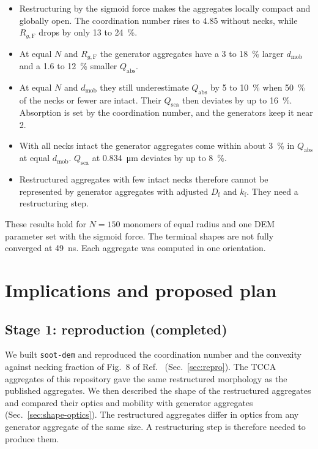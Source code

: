 \documentclass[11pt,a4paper]{article}
\newcommand{\Df}{D_\text{f}}
\begin{document}
\begin{itemize}
  \item Restructuring by the sigmoid force makes the aggregates locally compact and globally open.
        The coordination number rises to 4.85 without necks, while $R_{g,\text{F}}$ drops by only 13 to \SI{24}{\percent}.
  \item At equal $N$ and $R_{g,\text{F}}$ the generator aggregates have a 3 to \SI{18}{\percent} larger $d_\text{mob}$ and a 1.6 to \SI{12}{\percent} smaller $Q_\text{abs}$.
  \item At equal $N$ and $d_\text{mob}$ they still underestimate $Q_\text{abs}$ by 5 to \SI{10}{\percent} when \SI{50}{\percent} of the necks or fewer are intact.
        Their $Q_\text{sca}$ then deviates by up to \SI{16}{\percent}.
        Absorption is set by the coordination number, and the generators keep it near 2.
  \item With all necks intact the generator aggregates come within about \SI{3}{\percent} in $Q_\text{abs}$ at equal $d_\text{mob}$.
        $Q_\text{sca}$ at \SI{0.834}{\micro\meter} deviates by up to \SI{8}{\percent}.
  \item Restructured aggregates with few intact necks therefore cannot be represented by generator aggregates with adjusted $\Df$ and $k_\text{f}$.
        They need a restructuring step.
\end{itemize}

These results hold for $N = 150$ monomers of equal radius and one DEM parameter set with the sigmoid force.
The terminal shapes are not fully converged at \SI{49}{\nano\second}.
Each aggregate was computed in one orientation.

\section{Implications and proposed plan}
\label{sec:plan}

\subsection{Stage 1: reproduction (completed)}

We built \texttt{soot-dem} and reproduced the coordination number and the convexity against necking fraction of Fig.~8 of Ref.~\cite{demidov2024} (Sec.~\ref{sec:repro}).
The TCCA aggregates of this repository gave the same restructured morphology as the published aggregates.
We then described the shape of the restructured aggregates and compared their optics and mobility with generator aggregates (Sec.~\ref{sec:shape-optics}).
The restructured aggregates differ in optics from any generator aggregate of the same size.
A restructuring step is therefore needed to produce them.
\end{document}
